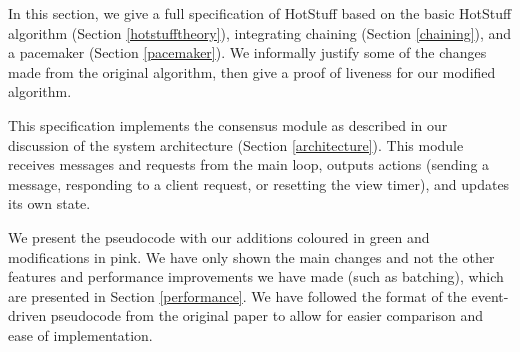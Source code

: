 In this section, we give a full specification of HotStuff based on the basic HotStuff algorithm (Section \ref{hotstufftheory}), integrating chaining (Section \ref{chaining}), and a pacemaker (Section \ref{pacemaker}). We informally justify some of the changes made from the original algorithm, then give a proof of liveness for our modified algorithm.

This specification implements the consensus module as described in our discussion of the system architecture (Section \ref{architecture}). This module receives messages and requests from the main loop, outputs actions (sending a message, responding to a client request, or resetting the view timer), and updates its own state.

We present the pseudocode with our additions coloured in green and modifications in pink. We have only shown the main changes and not the other features and performance improvements we have made (such as batching), which are presented in Section \ref{performance}. We have followed the format of the event-driven pseudocode from the original paper to allow for easier comparison and ease of implementation.


